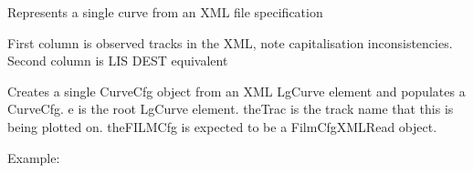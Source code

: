 \documentclass[letterpaper,10pt,english]{sphinxmanual}
\begin{document}

\begin{fulllineitems}
\label{\detokenize{ref/util/plot/PRESCfgXML:TotalDepth.util.plot.PRESCfgXML.CurveCfgXMLRead}}
Represents a single curve from an XML file specification

\begin{fulllineitems}
\label{\detokenize{ref/util/plot/PRESCfgXML:TotalDepth.util.plot.PRESCfgXML.CurveCfgXMLRead.TRAC_XML_UNIQUEID_TO_PRES}}
First column is observed tracks in the XML, note capitalisation inconsistencies.
Second column is LIS DEST equivalent

\end{fulllineitems}


\begin{fulllineitems}
\label{\detokenize{ref/util/plot/PRESCfgXML:TotalDepth.util.plot.PRESCfgXML.CurveCfgXMLRead.__init__}}
Creates a single CurveCfg object from an XML LgCurve element and populates a CurveCfg.
e is the root LgCurve element.
theTrac is the track name that this is being plotted on.
theFILMCfg is expected to be a FilmCfgXMLRead object.

Example:


\end{fulllineitems}
\end{fulllineitems}
\end{document}

